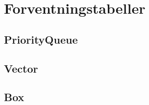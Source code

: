 % 

% 

% 

% 


% 

% 

% 

\label{sec:pq}


\section{Forventningstabeller}
\label{sec:forventningstabeller}
\subsection{PriorityQueue}

\clearpage

\clearpage
\subsection{Vector}

\clearpage
\subsection{Box}

\clearpage